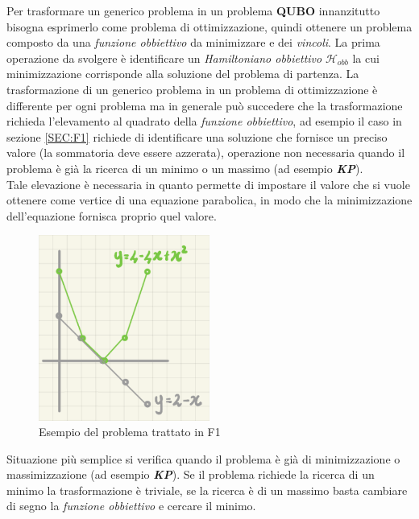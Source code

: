 \documentclass[a4paper]{article}
\newcommand{\imp}[1]{\textbf{\textit{#1}}}
\begin{document}
Per trasformare un generico problema in un problema \textbf{QUBO} innanzitutto bisogna esprimerlo come problema di ottimizzazione, quindi ottenere un problema composto da una \textit{funzione obbiettivo} da minimizzare e dei \textit{vincoli}.
La prima operazione da svolgere è identificare un \textit{Hamiltoniano obbiettivo} $\mathcal{H}_{obb}$ la cui minimizzazione corrisponde alla soluzione del problema di partenza.
La trasformazione di un generico problema in un problema di ottimizzazione è differente per ogni problema ma in generale può succedere che la trasformazione richieda l'elevamento al quadrato della \textit{funzione obbiettivo}, ad esempio il caso in sezione \ref{SEC:F1} richiede di identificare una soluzione che fornisce un preciso valore (la sommatoria deve essere azzerata), operazione non necessaria quando il problema è già la ricerca di un minimo o un massimo (ad esempio \imp{KP}).\\
Tale elevazione è necessaria in quanto permette di impostare il valore che si vuole ottenere come vertice di una equazione parabolica, in modo che la minimizzazione dell'equazione fornisca proprio quel valore.
\begin{figure}[!ht]
                \centering
                \includegraphics[width = 0.5\textwidth]{./img/F1.png}
                \caption{Esempio del problema trattato in F1} \label{FIG:F1_2}
\end{figure}
Situazione più semplice si verifica quando il problema è già di minimizzazione o massimizzazione (ad esempio \imp{KP}).
Se il problema richiede la ricerca di un minimo la trasformazione è triviale, se la ricerca è di un massimo basta cambiare di segno la \textit{funzione obbiettivo} e cercare il minimo.\\
\end{document}
